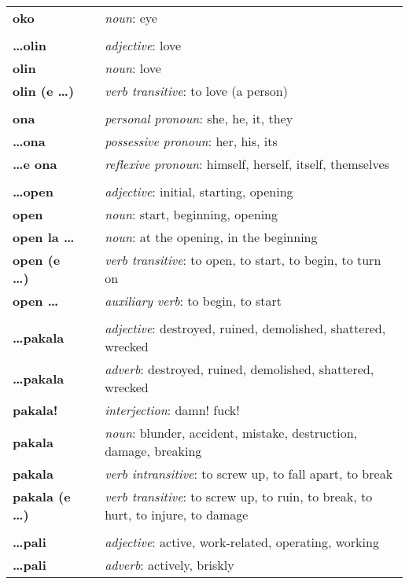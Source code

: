 \begin{supertabular}{p{2,5cm}|ll}
\textbf{oko} && \textit{noun}: eye \\ 
 && \\ %
\textbf{\dots olin} && \textit{adjective}: love \\ 
\textbf{olin} && \textit{noun}: love \\ 
\textbf{olin (e \dots)} && \textit{verb transitive}: to love (a person) \\ 
 && \\ %
\textbf{ona} && \textit{personal pronoun}: she, he, it, they \\ 
\textbf{\dots ona} && \textit{possessive pronoun}: her, his, its \\  
\textbf{\dots e ona} && \textit{reflexive pronoun}: himself, herself, itself, themselves \\  
 && \\ %
\textbf{\dots open} && \textit{adjective}: initial, starting, opening \\ 
\textbf{open} && \textit{noun}: start, beginning, opening \\ 
\textbf{open la \dots} && \textit{noun}: at the opening, in the beginning  \\ 
\textbf{open (e \dots)} && \textit{verb transitive}: to open, to start, to begin, to turn on \\ 
\textbf{open \dots } && \textit{auxiliary verb}: to begin, to start \\ 
 && \\ %
\textbf{\dots pakala} && \textit{adjective}: destroyed, ruined, demolished, shattered, wrecked \\ 
\textbf{\dots pakala} && \textit{adverb}: destroyed, ruined, demolished, shattered, wrecked \\ 
\textbf{pakala!} && \textit{interjection}: damn! fuck! \\ 
\textbf{pakala} && \textit{noun}: blunder, accident, mistake, destruction, damage, breaking \\ 
\textbf{pakala} && \textit{verb intransitive}: to screw up, to fall apart, to break \\ 
\textbf{pakala (e \dots)} && \textit{verb transitive}: to screw up, to ruin, to break, to hurt, to injure, to damage \\ 
 && \\ %
\textbf{\dots pali} && \textit{adjective}: active, work-related, operating, working \\ 
\textbf{\dots pali} && \textit{adverb}: actively, briskly \\ 

\end{supertabular}
